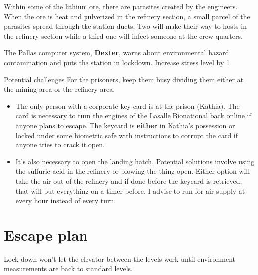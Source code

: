 Within some of the lithium ore, there are parasites created by the engineers. When the ore is heat and pulverized in the refinery section, a small parcel of the parasites spread through the station ducts. Two will make their way to hosts in the refinery section while a third one will infect someone at the crew quarters. 

The Pallas computer system, \textbf{Dexter}, warns about environmental hazard contamination and puts the station in lockdown. Increase stress level by 1



\medskip
\begin{rpg-commentbox}{Potential challenges}
For the prisoners, keep them busy dividing them either at the mining area or the refinery area.

\begin{itemize}
    \item The only person with a corporate key card is at the prison (Kathia). The card is necessary to turn the engines of the Lasalle Bionational back online if anyone plans to escape. The keycard is \textbf{either} in Kathia's possession or locked under some biometric safe with instructions to corrupt the card if anyone tries to crack it open. 

    \item It's also necessary to open the landing hatch. Potential solutions involve using the sulfuric acid in the refinery or blowing the thing open. Either option will take the air out of the refinery and if done before the keycard is retrieved, that will put everything on a timer before. I advise to run for air supply at every hour instead of every turn.
\end{itemize}
\end{rpg-commentbox}



    


\newsect

\section{Escape plan}


Lock-down won't let the elevator between the levels work until environment measurements are back to standard levels.



